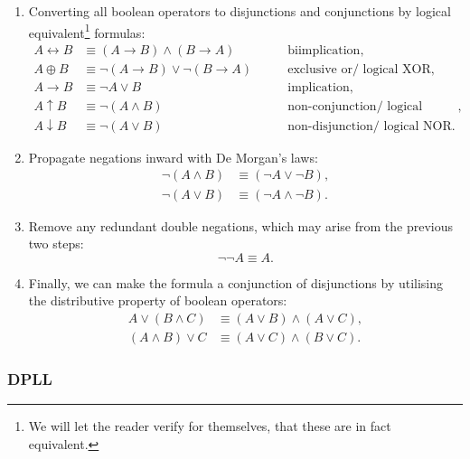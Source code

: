 \begin{enumerate}
    \item Converting all boolean operators to disjunctions and conjunctions by logical equivalent\footnote{We will let the reader verify for themselves, that these are in fact equivalent.} formulas:
    \begin{align*}
        A \leftrightarrow B &\equiv (A \rightarrow  B) \wedge (B \rightarrow A) \qquad &\text{biimplication},
        \\
        A \oplus B &\equiv \neg (A \rightarrow B) \vee \neg (B \rightarrow A) \qquad &\text{exclusive or/ logical XOR},
        \\
        A \rightarrow B &\equiv \neg A \vee B \qquad &\text{implication},
        \\
        A \uparrow B &\equiv \neg (A \wedge B) \qquad &\text{non-conjunction/ logical NAND},
        \\
        A \downarrow B &\equiv \neg (A \vee B) \qquad &\text{non-disjunction/ logical NOR}.
    \end{align*}
    \item Propagate negations inward with De Morgan's laws\cite{A-Concise-Introduction-to-Logic,Introduction-to-logic,Math-Logic-for-CompSci}:
    \begin{align*}
        \neg (A \wedge B) &\equiv (\neg A \vee \neg B),
        \\
        \neg (A \vee B) &\equiv (\neg A \wedge \neg B).
    \end{align*}
    \item Remove any redundant double negations, which may arise from the previous two steps:
    \begin{equation*}
        \neg \neg A \equiv A.
    \end{equation*}
    \item Finally, we can make the formula a conjunction of disjunctions by utilising the distributive property of boolean operators:
    \begin{align*}
        A \vee (B \wedge C) &\equiv (A \vee B) \wedge (A \vee C),
        \\
        (A \wedge B) \vee C &\equiv (A \vee C) \wedge (B \vee C).
    \end{align*}
\end{enumerate}


\subsubsection{DPLL}




